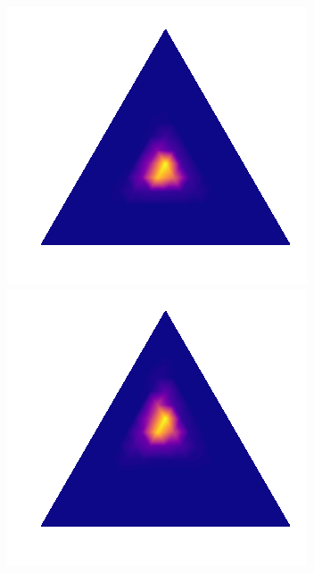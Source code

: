 \begin{figure}
 \begin{minipage}[]{.3\textwidth}
    \includegraphics[width=\textwidth]{plots/experiment_structures/triangle_10kld.png}
\subcaption{}
\end{minipage}
 \begin{minipage}{.3\textwidth}
    \includegraphics[width=\textwidth]{plots/experiment_structures/triangle_10elbo.png}

\end{minipage}
\end{figure}
